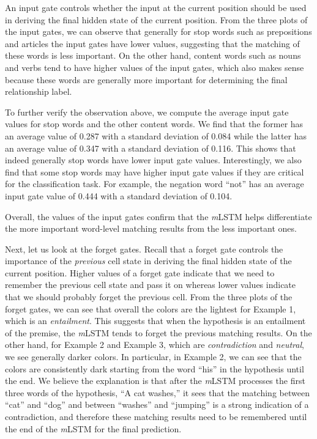 \documentclass[11pt,letterpaper]{article}
\begin{document}
An input gate controls whether the input at the current position should be used in deriving the final hidden state of the current position.
From the three plots of the input gates, we can observe that generally for stop words such as prepositions and articles the input gates have lower values, suggesting that the matching of these words is less important.
On the other hand, content words such as nouns and verbs tend to have higher values of the input gates, which also makes sense because these words are generally more important for determining the final relationship label. 

To further verify the observation above, we compute the average input gate values for stop words and the other content words. 
We find that the former has an average value of 0.287 with a standard deviation of 0.084 while the latter has an average value of 0.347 with a standard deviation of 0.116. 
This shows that indeed generally stop words have lower input gate values.
Interestingly, we also find that some stop words may have higher input gate values if they are critical for the classification task.
For example, the negation word ``not'' has an average input gate value of 0.444 with a standard deviation of 0.104.

Overall, the values of the input gates confirm that the \emph{m}LSTM helps differentiate the more important word-level matching results from the less important ones. 

Next, let us look at the forget gates.
Recall that a forget gate controls the importance of the \emph{previous} cell state in deriving the final hidden state of the current position.
Higher values of a forget gate indicate that we need to remember the previous cell state and pass it on whereas lower values indicate that we should probably forget the previous cell.
From the three plots of the forget gates, we can see that overall the colors are the lightest for Example 1, which is an \emph{entailment}.
This suggests that when the hypothesis is an entailment of the premise, the \emph{m}LSTM tends to forget the previous matching results.
On the other hand, for Example 2 and Example 3, which are \emph{contradiction} and \emph{neutral}, we see generally darker colors.
In particular, in Example 2, we can see that the colors are consistently dark starting from the word ``his'' in the hypothesis until the end.
We believe the explanation is that after the \emph{m}LSTM processes the first three words of the hypothesis, ``A cat washes,'' it sees that the matching between ``cat'' and ``dog'' and between ``washes'' and ``jumping'' is a strong indication of a contradiction, and therefore these matching results need to be remembered until the end of the \emph{m}LSTM for the final prediction.
\end{document}

